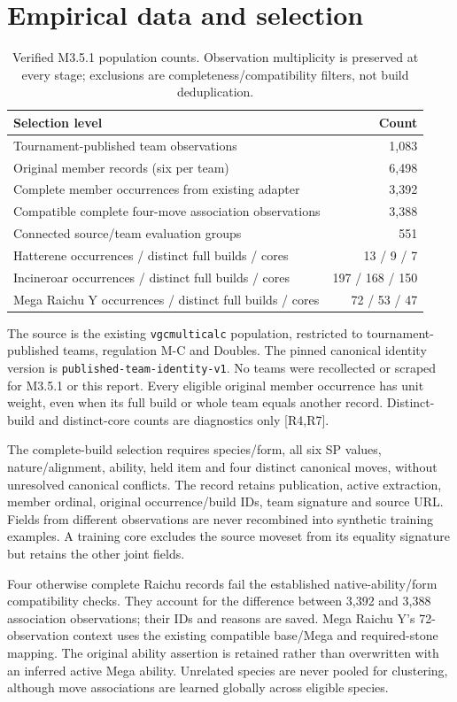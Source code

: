 \documentclass[10pt,a4paper]{article}
\begin{document}
\section{Empirical data and selection}
\begin{table}[!ht]\centering
\caption{Verified M3.5.1 population counts. Observation multiplicity is preserved at every stage; exclusions are completeness/compatibility filters, not build deduplication.}
\begin{tabular}{lr}\toprule Selection level & Count\\\midrule
Tournament-published team observations & 1,083\\
Original member records (six per team) & 6,498\\
Complete member occurrences from existing adapter & 3,392\\
Compatible complete four-move association observations & 3,388\\
Connected source/team evaluation groups & 551\\\midrule
Hatterene occurrences / distinct full builds / cores & 13 / 9 / 7\\
Incineroar occurrences / distinct full builds / cores & 197 / 168 / 150\\
Mega Raichu Y occurrences / distinct full builds / cores & 72 / 53 / 47\\\bottomrule
\end{tabular}\end{table}
The source is the existing \texttt{vgcmulticalc} population, restricted to tournament-published teams, regulation M-C and Doubles. The pinned canonical identity version is \texttt{published-team-identity-v1}. No teams were recollected or scraped for M3.5.1 or this report. Every eligible original member occurrence has unit weight, even when its full build or whole team equals another record. Distinct-build and distinct-core counts are diagnostics only [R4,R7].

The complete-build selection requires species/form, all six SP values, nature/alignment, ability, held item and four distinct canonical moves, without unresolved canonical conflicts. The record retains publication, active extraction, member ordinal, original occurrence/build IDs, team signature and source URL. Fields from different observations are never recombined into synthetic training examples. A training core excludes the source moveset from its equality signature but retains the other joint fields.

Four otherwise complete Raichu records fail the established native-ability/form compatibility checks. They account for the difference between 3,392 and 3,388 association observations; their IDs and reasons are saved. Mega Raichu Y's 72-observation context uses the existing compatible base/Mega and required-stone mapping. The original ability assertion is retained rather than overwritten with an inferred active Mega ability. Unrelated species are never pooled for clustering, although move associations are learned globally across eligible species.
\end{document}
